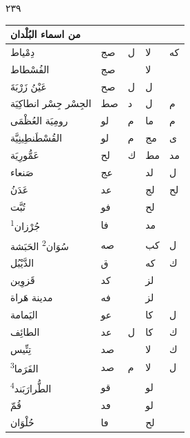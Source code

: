 \documentclass[11pt]{article}
\newcommand{\AbjadZero}{{\NallinoSigns\symbol{"E000}}}
\begin{document}
\clearpage
{\large \textarabic{٢٣٩}}\par\vspace{1mm}
\begin{Arabic}
\noindent\begin{minipage}[t]{0.495\textwidth}\setlength{\tabcolsep}{2.2pt}\begin{tabular}{|p{55mm}|>{\centering\arraybackslash}p{4.8mm}>{\centering\arraybackslash}p{4.8mm}|>{\centering\arraybackslash}p{4.8mm}>{\centering\arraybackslash}p{4.8mm}|}\hline
\centering من اسماء البُلْدان & \multicolumn{2}{c|}{الطول} & \multicolumn{2}{c|}{العرض} \\ \hline
{}دِمْياط & صج & ل & لا & كه \\
{}الفُسْطاط & صج & \AbjadZero{} & لا & \AbjadZero{} \\
{}عَيْنُ زَرْبَةَ & صح & ل & ل & \AbjadZero{} \\
{}الجِسْر جِسْر انطاكِيَة & صط & د & ل & م \\
{}رومِيَة العُظْمَى & لو & م & ما & م \\
{}القُسْطَنطِينِيَّة & لو & م & مج & ى \\
{}عَمُّورِيَة & لح & ك & مط & مد \\
{}صَنعاء & عج & \AbjadZero{} & لد & ل \\
{}عَدَنُ & عد & \AbjadZero{} & لج & لح \\
{}تُبَّت & فو & \AbjadZero{} & لح & \AbjadZero{} \\
{}جُرْزان\textsuperscript{1} & فا & \AbjadZero{} & مد & \AbjadZero{} \\
{}سُوَان\textsuperscript{2} الحَبَشة & صه & \AbjadZero{} & كب & ل \\
{}الدَّيْبُل & ق & \AbjadZero{} & كه & ك \\
{}قَزوِين & كد & \AbjadZero{} & لز & \AbjadZero{} \\
{}مدينة هَراة & فه & \AbjadZero{} & لز & \AbjadZero{} \\
{}اليَمامة & عو & \AbjadZero{} & كا & ل \\
{}الطائِف & عد & ل & كا & ك \\
{}تِنِّيس & صد & \AbjadZero{} & لا & ك \\
{}الفَرَما\textsuperscript{3} & صد & م & لا & ل \\
{}الطُّرارَبَند\textsuperscript{4} & قو & \AbjadZero{} & لو & \AbjadZero{} \\
{}قُمّ & ڡد & \AbjadZero{} & لو & \AbjadZero{} \\
{}حُلْوَان & ڡا & \AbjadZero{} & لح & \AbjadZero{} \\

\end{tabular}
\end{minipage}
\end{Arabic}
\end{document}
